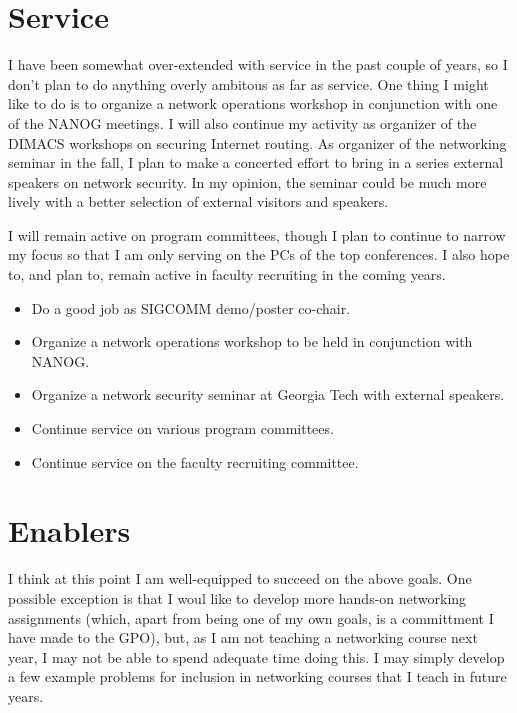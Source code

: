 \begin{sloppypar}

\section*{Service}

I have been somewhat over-extended with service in the past couple of
years, so I don't plan to do anything overly ambitous as far as service.
One thing I might like to do is to organize a network operations
workshop in conjunction with one of the NANOG meetings.  I will also
continue my activity as organizer of the DIMACS workshops on securing
Internet routing.  As organizer of the networking seminar in the fall, I
plan to make a concerted effort to bring in a series external speakers
on network security.  In my opinion, the seminar could be much more
lively with a better selection of external visitors and speakers.

I will remain active on program committees, though I plan to continue to
narrow my focus so that I am only serving on the PCs of the top
conferences.  I also hope to, and plan to, remain active in faculty
recruiting in the coming years.


\begin{itemize}
\itemsep=-1pt
\item Do a good job as SIGCOMM demo/poster co-chair.
\item Organize a network operations workshop to be held in conjunction
with NANOG.
\item Organize a network security seminar at Georgia Tech with external
speakers. 
\item Continue service on various program committees.
\item Continue service on the faculty recruiting committee.
\end{itemize}



\section*{Enablers}


I think at this point I am well-equipped to succeed on the above goals.
One possible exception is that I woul like to develop more hands-on
networking assignments (which, apart from being one of my own goals, is
a committment I have made to the GPO), but, as I am not teaching a
networking course next year, I may not be able to spend adequate time
doing this.  I may simply develop a few example problems for inclusion
in networking courses that I teach in future years.


\end{sloppypar}
